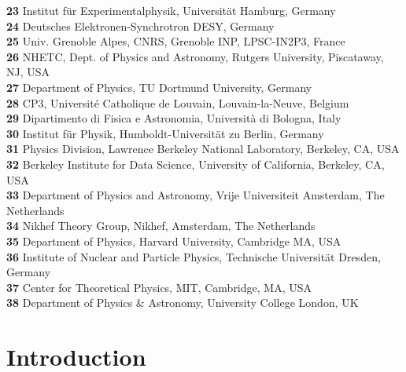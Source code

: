 \documentclass[submission,Phys]{SciPost}
\begin{document}
\begin{center}
{\bf 23} Institut f\"ur Experimentalphysik, Universit\"at Hamburg, Germany \\
{\bf 24} Deutsches Elektronen-Synchrotron DESY, Germany\\ 
{\bf 25} Univ. Grenoble Alpes, CNRS, Grenoble INP, LPSC-IN2P3, France  \\
{\bf 26} NHETC, Dept. of Physics and Astronomy, Rutgers University, Piscataway, NJ, USA \\
{\bf 27} Department of Physics, TU Dortmund University, Germany \\
{\bf 28} CP3, Universit\'e Catholique de Louvain, Louvain-la-Neuve, Belgium \\
{\bf 29} Dipartimento di Fisica e Astronomia, Universit\`a di Bologna, Italy\\
{\bf 30} Institut f\"ur Physik, Humboldt-Universit\"at zu Berlin, Germany\\
{\bf 31} Physics Division, Lawrence Berkeley National Laboratory, Berkeley, CA, USA\\
{\bf 32} Berkeley Institute for Data Science, University of California, Berkeley, CA, USA\\
{\bf 33} Department of Physics and Astronomy, Vrije Universiteit Amsterdam, The Netherlands \\
{\bf 34} Nikhef Theory Group, Nikhef, Amsterdam, The Netherlands \\
{\bf 35} Department of Physics, Harvard University, Cambridge MA, USA  \\
{\bf 36} Institute of Nuclear and Particle Physics, Technische Universit{\"a}t Dresden, Germany \\
{\bf 37} Center for Theoretical Physics, MIT, Cambridge, MA, USA \\
{\bf 38} Department of Physics \& Astronomy, University College London, UK  \\
\end{center}

\clearpage
\section{Introduction}
\label{sec:intro}
\end{document}
